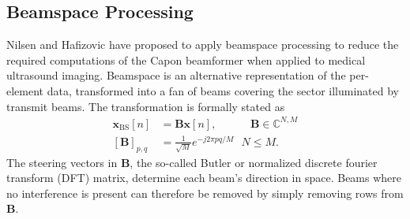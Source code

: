 \documentclass[journal]{IEEEtran}
\newcommand{\mat}[1]{\mathbf{#1}}
\renewcommand{\vec}[1]{\mathbf{#1}}
\begin{document}



\subsection{Beamspace Processing}\label{bs-capon}
Nilsen and Hafizovic \cite{Nilsen2009} have proposed to apply beamspace processing to reduce the required computations of the Capon beamformer when applied to medical ultrasound imaging. Beamspace is an alternative representation of the per-element data, transformed into a fan of beams covering the sector illuminated by transmit beams. The transformation is formally stated as
\begin{align}
\vec{x}_\text{BS}[n] &= \mat{B}\vec{x}[n], \ \ \ \ \ \ \ \ \ \ \ \ \ \, \mat{B} \in \mathbb{C}^{N,M} \label{eq:butler} \\ 
[\mat{B}]_{p,q} &= \frac{1}{\sqrt{M}}e^{-j 2 \pi p q / M} \ \ \ N \le M.
\end{align} 
The steering vectors in $\mat{B}$, the so-called Butler or normalized discrete fourier transform (DFT) matrix, determine each beam's direction in space. Beams where no interference is present can therefore be removed by simply removing rows from $\mat{B}$. 
\end{document}
